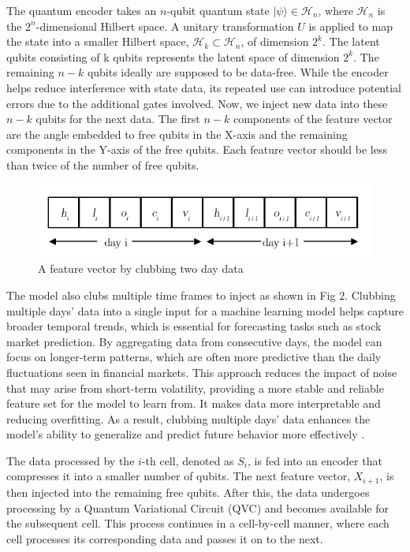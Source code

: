 \documentclass[conference]{IEEEtran}
\begin{document}
The quantum encoder takes an \(n\)-qubit quantum state \(|\psi\rangle \in \mathcal{H}_n\), where \(\mathcal{H}_n\) is the \(2^n\)-dimensional Hilbert space. A unitary transformation \(U\) is applied to map the state into a smaller Hilbert space, \(\mathcal{H}_k \subset \mathcal{H}_n\), of dimension \(2^k\). The latent qubits consisting of k qubits represents the latent space of dimension \(2^k\). The remaining \(n-k\) qubits ideally are supposed to be data-free.
 While the encoder helps reduce interference with state data, its repeated use can introduce potential errors due to the additional gates involved. Now, we inject new data into these \(n-k\) qubits for the next data. The first $n - k$ components of the feature vector are the angle embedded to free qubits in the X-axis and the remaining components in the Y-axis of the free qubits. Each feature vector should be less than twice of the number of free qubits.
\begin{figure}
    \centering
    \includegraphics[width=1\linewidth]{feature vector.png}
    \caption{A feature vector by clubbing two day data}
    \label{fig:enter-label}
\end{figure}

The model also clubs multiple time frames to inject as shown in Fig 2. Clubbing multiple days' data into a single input for a machine learning model helps capture broader temporal trends, which is essential for forecasting tasks such as stock market prediction. By aggregating data from consecutive days, the model can focus on longer-term patterns, which are often more predictive than the daily fluctuations seen in financial markets. This approach reduces the impact of noise that may arise from short-term volatility, providing a more stable and reliable feature set for the model to learn from. It makes data more interpretable and reducing overfitting. As a result, clubbing multiple days' data enhances the model's ability to generalize and predict future behavior more effectively \cite{b18}.

The data processed by the $i$-th cell, denoted as $S_i$, is fed into an encoder that compresses it into a smaller number of qubits. The next feature vector, $X_{i+1}$, is then injected into the remaining free qubits. After this, the data undergoes processing by a Quantum Variational Circuit (QVC) and becomes available for the subsequent cell. This process continues in a cell-by-cell manner, where each cell processes its corresponding data and passes it on to the next.
\end{document}
